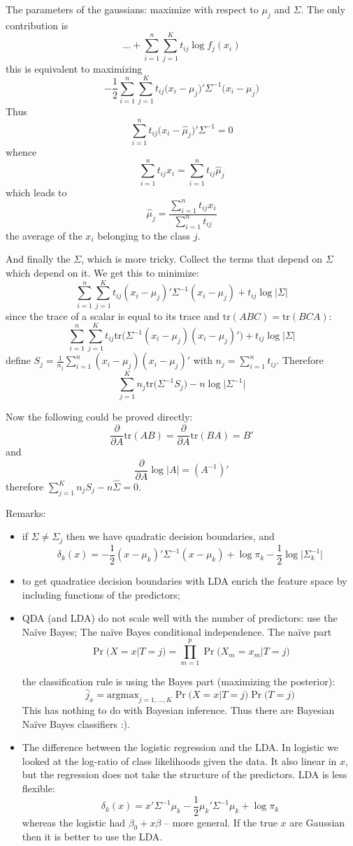 \documentclass[a4paper]{article}
\newcommand{\tr}{\text{tr}}
\begin{document}
The parameters of the gaussians: maximize with respect to $\mu_j$ and $\Sigma$. The only contribution is
\[\ldots + \sum_{i=1}^n \sum_{j=1}^K t_{ij} \log f_j(x_i) \]
this is equivalent to maximizing
\[ -\frac{1}{2} \sum_{i=1}^n \sum_{j=1}^K t_{ij} \big(x_i-\mu_j\big)'\Sigma^{-1}\big(x_i-\mu_j\big)\] 
Thus
\[\sum_{i=1}^n t_{ij} \big(x_i-\hat{\mu}_j\big)'\Sigma^{-1} = 0\]
whence
\[\sum_{i=1}^n t_{ij} x_i = \sum_{i=1}^n t_{ij} \hat{\mu}_j\]
which leads to
\[\hat{\mu}_j = \frac{\sum_{i=1}^n t_{ij} x_i }{\sum_{i=1}^n t_{ij}}\]
the average of the $x_i$ belonging to the class $j$.

And finally the $\Sigma$, which is more tricky.
Collect the terms that depend on $\Sigma$ which depend on it. We get this to minimize:
\[ \sum_{i=1}^n \sum_{j=1}^K t_{ij} (x_i-\mu_j)'\Sigma^{-1}(x_i-\mu_j) + t_{ij} \log \lvert\Sigma\rvert \]
since the trace of a scalar is equal to its trace and $\tr(ABC) = \tr(BCA)$:
\[\sum_{i=1}^n \sum_{j=1}^K t_{ij} \tr\big( \Sigma^{-1}(x_i-\mu_j)(x_i-\mu_j)'\big) + t_{ij} \log \lvert\Sigma\rvert\] 
define $S_j = \frac{1}{n_j}\sum_{i=1}^n(x_i-\mu_j)(x_i-\mu_j)'$ with $n_j=\sum_{i=1}^n t_{ij}$. Therefore
\[\sum_{j=1}^K n_j \tr\big( \Sigma^{-1} S_j \big) - n \log \lvert\Sigma^{-1}\rvert\] 

Now the following could be proved directly:
\[\frac{\partial}{\partial A}\tr(AB) = \frac{\partial}{\partial A}\tr(BA) = B'\]
and
\[\frac{\partial}{\partial A}\log \lvert A\rvert = (A^{-1})'\]
therefore $\sum_{j=1}^K n_j S_j - n \hat{\Sigma} = 0$.

Remarks: \begin{itemize}
	\item if $\Sigma\neq\Sigma_j$ then we have quadratic decision boundaries, and 
	\[\delta_k(x) = - \frac{1}{2} (x-\mu_k)'\Sigma^{-1}(x-\mu_k) + \log \pi_k - \frac{1}{2}\log\lvert\Sigma_k^{-1}\rvert\]
	\item to get quadratice decision boundaries with LDA enrich the feature space by including functions of the predictors;
	\item QDA (and LDA) do not scale well with the number of predictors: use the Na\"ive Bayes;
	The na\"ive Bayes conditional independence. The na\"ive part
	\[\Pr\big(X=x\vert T=j\big) = \prod_{m=1}^p \Pr\big(X_m=x_m\vert T=j\big)\]

	the classification rule is using the Bayes part (maximizing the posterior):
	\[\hat{j}_x = \text{argmax}_{j=1,\ldots, K} \Pr\big(X=x\vert T=j\big) \Pr\big(T=j\big)\]
	This has nothing to do with Bayesian inference. Thus there are Bayesian Na\"ive Bayes classifiers :).
	\item The difference between the logistic regression and the LDA. In logistic we looked at
	the log-ratio of class likelihoods given the data. It also linear in $x$, but the regression
	does not take the structure of the predictors.
	LDA is less flexible:
	\[\delta_k(x) = x'\Sigma^{-1}\mu_k - \frac{1}{2} \mu_k'\Sigma^{-1}\mu_k + \log \pi_k\]
	whereas the logistic had $\beta_0 + x\beta$ -- more general.
	If the true $x$ are Gaussian then it is better to use the LDA.
\end{itemize}
\end{document}
